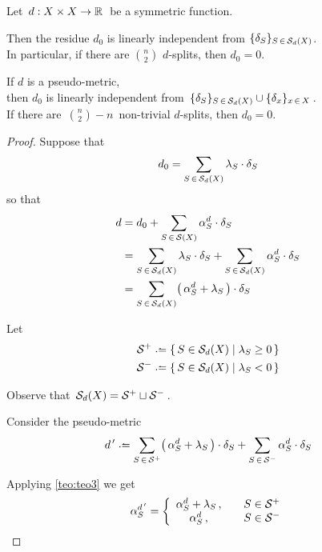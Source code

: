 \documentclass[./main.tex]{subfiles}
\begin{document}
\begin{corollary}[{\cites[Corollary 5]{BD92a}}]
    Let $\, d : {X \times X} \to \mathbb{R} \,$ be a symmetric function.

    Then the residue $d_0$ is linearly independent from $\{\delta_S\}_{S \,\in\, {\mathcal{S}}_d(X)}$. \\
    In particular, if there are $\binom{n}{2}$ $d$-splits, then $d_0 = 0$.

    If $d$ is a pseudo-metric, \\
    \bsp then $d_0$ is linearly independent from $\, \{\delta_S\}_{S \,\in\, {\mathcal{S}}_d(X)} \cup \{\delta_x\}_{x \,\in\, X} \,$. \\
    If there are $\, \binom{n}{2} - n \,$ non-trivial $d$-splits, then $d_0 = 0$.
\end{corollary}
\begin{proof}
    Suppose that
    \[ d_0 = \sum_{S \,\in\, {\mathcal{S}}_d(X)} \lambda_S \cdot \delta_S \]
    so that
    \begin{align*}
        d &= d_0 + \sum_{S \,\in\, {\mathcal{S}}(X)} \alpha_S^d \cdot \delta_S \\
        &= \sum_{S \,\in\, {\mathcal{S}}_d(X)} \lambda_S \cdot \delta_S + \sum_{S \,\in\, {\mathcal{S}}_d(X)} \alpha_S^d \cdot \delta_S \\
        &= \sum_{S \,\in\, {\mathcal{S}}_d(X)} \bigl(\, \alpha_S^d + \lambda_S \,\bigr) \cdot \delta_S
    \end{align*}

    Let
    \begingroup \nospabv
    \begin{align*}
        \Sc^+ &\defeq \{\, S \in \Sc_d(X) \mid \lambda_S \geq 0 \,\} \\
        \Sc^- &\defeq \{\, S \in \Sc_d(X) \mid \lambda_S < 0 \,\}
    \end{align*}
    \endgroup
    
    Observe that $\, {\mathcal{S}}_d(X) = {\mathcal{S}}^+ \sqcup {\mathcal{S}}^- \,$.

    Consider the pseudo-metric
    \[ \dpr \defeq \sum_{S \,\in\, \Sc^+} \bigl(\, \alpha_S^d + \lambda_S \,\bigr) \cdot \delta_S + \sum_{S \,\in\, \Sc^-} \alpha_S^d \cdot \delta_S \]

    Applying \autoref{teo:teo3} we get
    \[ \alpha_S^{d^{\,\prime}} = \bigg\{
        \begin{array}{cl}
            \alpha_S^d + \lambda_S \,,  & \quad S \in {\mathcal{S}}^+ \\
            \alpha_S^d \,,              & \quad S \in {\mathcal{S}}^-
        \end{array}
    \]


\end{proof}
\end{document}
